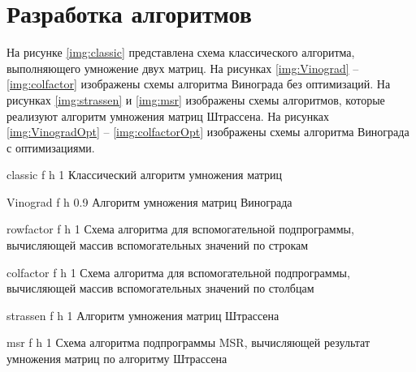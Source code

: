 \section{Разработка алгоритмов}

На рисунке \ref{img:classic} представлена схема классического алгоритма, выполняющего умножение двух матриц. 
На рисунках \ref{img:Vinograd} -- \ref{img:colfactor} изображены схемы алгоритма Винограда без оптимизаций. 
На рисунках \ref{img:strassen} и \ref{img:msr} изображены схемы алгоритмов, которые реализуют алгоритм умножения матриц Штрассена.  
На рисунках \ref{img:VinogradOpt} -- \ref{img:colfactorOpt} изображены схемы алгоритма Винограда с оптимизациями.

\clearpage

{classic} %
{f} %
{h} %
{1\textwidth} %
{Классический алгоритм умножения матриц} %


{Vinograd} %
{f} %
{h} %
{0.9\textwidth} %
{Алгоритм умножения матриц Винограда} %

{rowfactor} %
{f} %
{h} %
{1\textwidth} %
{Схема алгоритма для вспомогательной подпрограммы, вычисляющей массив вспомогательных значений по строкам} %

{colfactor} %
{f} %
{h} %
{1\textwidth} %
{Схема алгоритма для вспомогательной подпрограммы, вычисляющей массив вспомогательных значений по столбцам} %

{strassen} %
{f} %
{h} %
{1\textwidth} %
{Алгоритм умножения матриц Штрассена} %

{msr} %
{f} %
{h} %
{1\textwidth} %
{Схема алгоритма подпрограммы MSR, вычисляющей результат умножения матриц по алгоритму Штрассена} %

